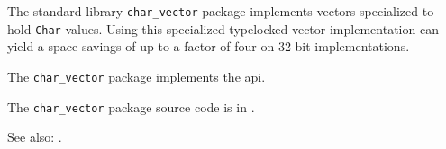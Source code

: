 
The standard library {\tt char\_vector} package implements vectors specialized to hold 
{\tt Char} values.  Using this specialized typelocked vector implementation can 
yield a space savings of up to a factor of four on 32-bit implementations.

The {\tt char\_vector} package implements the  api.

The {\tt char\_vector} package source code is in .

See also:   .


